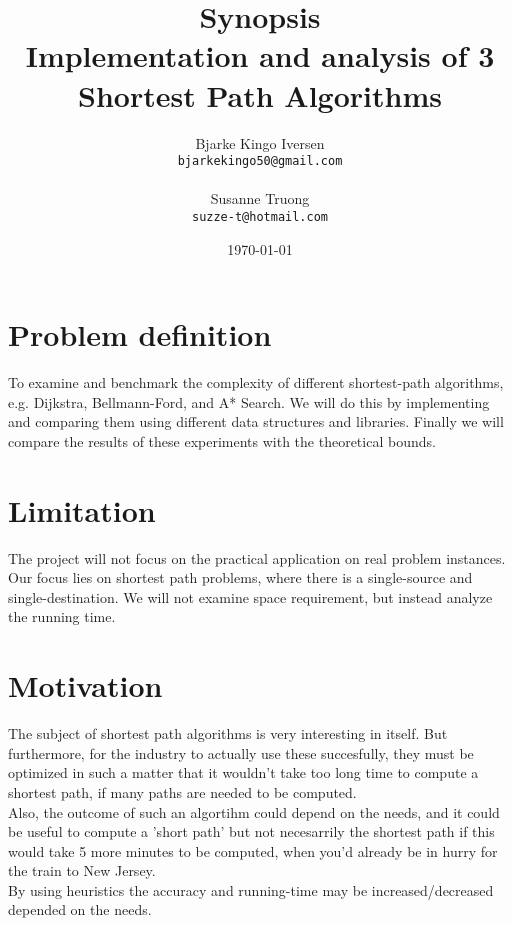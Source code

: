 \documentclass[11pt]{article}
\title{
  \vspace{3cm}
  \Huge{Synopsis} \\
  \Large{Implementation and analysis of 3 Shortest Path Algorithms}
}
\author{
  \Large{Bjarke Kingo Iversen}
  \\ \texttt{bjarkekingo50@gmail.com} \\\\
  \Large{Susanne Truong}
  \\ \texttt{suzze-t@hotmail.com}
}
\date{
    \today
}
\def \ColourPDF {include/ku-farve}
\def \TitlePDF   {include/ku-en}  %
\begin{document}


\clearpage\maketitle
\thispagestyle{empty}

\newpage

\section{Problem definition}
To examine and benchmark the complexity of different shortest-path algorithms, e.g. Dijkstra, Bellmann-Ford, and A* Search. We will do this by implementing and comparing them using different data structures and libraries. Finally we will compare the results of these experiments with the theoretical bounds.
\section{Limitation}
The project will not focus on the practical application on real problem instances. Our focus lies on shortest path problems, where there is a single-source and single-destination. We will not examine space requirement, but instead analyze the running time.
\section{Motivation}
The subject of shortest path algorithms is very interesting in itself. But furthermore, for the industry to actually use these succesfully, they must be optimized in such a matter that it wouldn't take too long time to compute a shortest path, if many paths are needed to be computed.\\
Also, the outcome of such an algortihm could depend on the needs, and it could be useful to compute a 'short path' but not necesarrily the shortest path if this would take 5 more minutes to be computed, when you'd already be in hurry for the train to New Jersey.\\
By using heuristics the accuracy and running-time may be increased/decreased depended on the needs.\\
\end{document}
